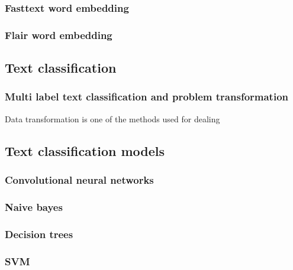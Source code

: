\subsubsection{Fasttext word embedding}

\subsubsection{Flair word embedding}

\subsection{Text classification}

\subsubsection{Multi label text classification and problem transformation}

Data transformation is one of the methods used for dealing 
\subsection{Text classification models}


\subsubsection{Convolutional neural networks}
\subsubsection{Naive bayes}
\subsubsection{Decision trees}
\subsubsection{SVM}

